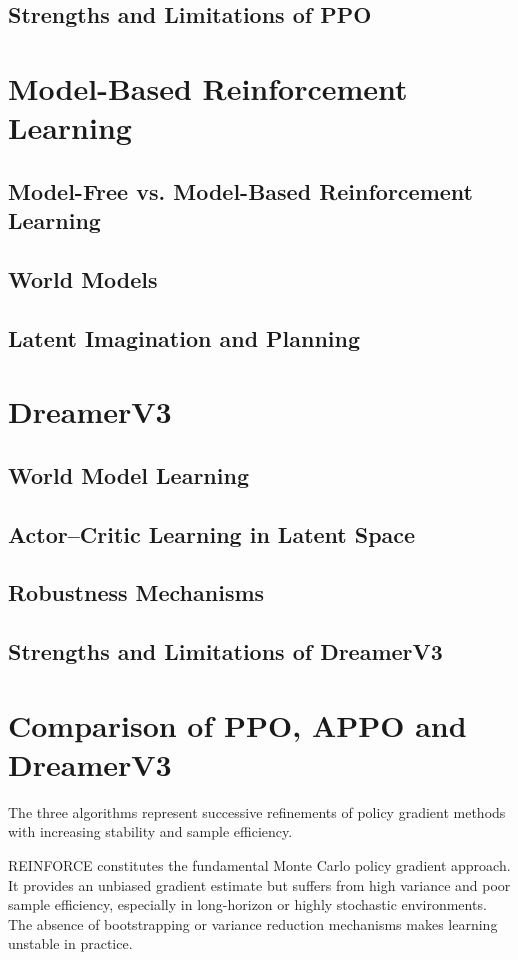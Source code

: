 \documentclass[english,bachelor]{hsluthesis}
\begin{document}
\subsection{Strengths and Limitations of PPO}

\section{Model-Based Reinforcement Learning}
\subsection{Model-Free vs. Model-Based Reinforcement Learning}
\subsection{World Models}
\subsection{Latent Imagination and Planning}

\section{DreamerV3}
\subsection{World Model Learning}
\subsection{Actor--Critic Learning in Latent Space}
\subsection{Robustness Mechanisms}
\subsection{Strengths and Limitations of DreamerV3}

\section{Comparison of PPO, APPO and DreamerV3}

The three algorithms represent successive refinements of policy gradient methods with increasing stability and sample efficiency.

REINFORCE constitutes the fundamental Monte Carlo policy gradient approach. It provides an unbiased gradient estimate but suffers from high variance and poor sample efficiency, especially in long-horizon or highly stochastic environments. The absence of bootstrapping or variance reduction mechanisms makes learning unstable in practice.
\end{document}
